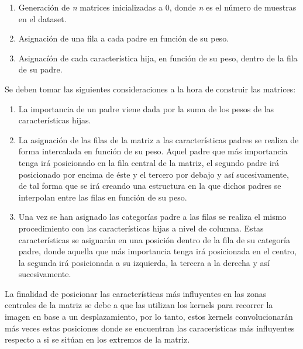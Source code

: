         \begin{enumerate}

            \item Generación de \textit{n} matrices inicializadas a 0, donde \textit{n} es el número de muestras en el dataset.
            \item Asignación de una fila a cada padre en función de su peso.
            \item Asignacíón de cada característica hija, en función de su peso, dentro de la fila de su padre.
        
        \end{enumerate}

        Se deben tomar las siguientes consideraciones a la hora de construir las matrices:

        \begin{enumerate}

            \item La importancia de un padre viene dada por la suma de los pesos de las características hijas.

            \item La asignación de las filas de la matriz a las características padres se realiza de forma intercalada en función de su peso. Aquel padre que más importancia tenga irá posicionado en la fila central de la matriz, el segundo padre irá posicionado por encima de éste y el tercero por debajo y así sucesivamente, de tal forma que se irá creando una estructura en la que dichos padres se interpolan entre las filas en función de su peso.

            \item Una vez se han asignado las categorías padre a las filas se realiza el mismo procedimiento con las características hijas a nivel de columna. Estas características se asignarán en una posición dentro de la fila de su categoría padre, donde aquella que más importancia tenga irá posicionada en el centro, la segunda irá posicionada a su izquierda, la tercera a la derecha y así sucesivamente.
        \end{enumerate}


        La finalidad de posicionar las características más influyentes en las zonas centrales de la matriz se debe a que las  utilizan los kernels para recorrer la imagen en base a un desplazamiento, por lo tanto, estos kernels convolucionarán más veces estas posiciones donde se encuentran las caracerísticas más influyentes respecto a si se sitúan en los extremos de la matriz.

